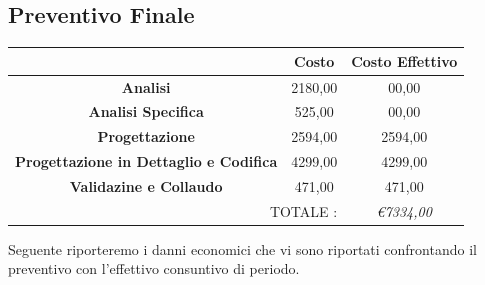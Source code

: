 \documentclass[12pt,a4paper,titlepage]{article}
\begin{document}
	\subsection{Preventivo Finale}
	{\renewcommand\arraystretch{1.2}  %
		\begin{tabular}{|c|c|c|}
			\hline 
			& \textbf{Costo} & \textbf{Costo Effettivo} \\ 
			\hline 
			\textbf{Analisi} & 2180,00 & 00,00 \\ 
			\hline 
			\textbf{Analisi Specifica} & 525,00 & 00,00 \\ 
			\hline 
			\textbf{Progettazione} & 2594,00 & 2594,00 \\ 
			\hline 
			\textbf{Progettazione in Dettaglio e Codifica} & 4299,00 & 4299,00 \\ 
			\hline 
			\textbf{Validazine e Collaudo} & 471,00 & 471,00 \\ 
			\hline 
			\multicolumn{2}{r|}{TOTALE :} & \textit{\euro 7334,00 } \\ 
		\end{tabular}
	} 
	\vspace{0.5cm}
	
	Seguente riporteremo i danni economici che vi sono riportati confrontando il preventivo con l'effettivo consuntivo di periodo.
	
\end{document}
